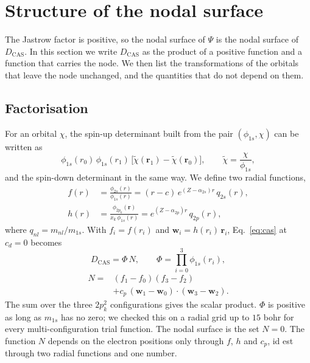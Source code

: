 \documentclass[aps,prb,reprint,amsmath,amssymb,superscriptaddress,nofootinbib]{revtex4-2}
\begin{document}
\section{Structure of the nodal surface}
\label{sec:nodes}

The Jastrow factor is positive, so the nodal surface of $\Psi$ is the nodal
surface of $D_{\mathrm{CAS}}$. In this section we write $D_{\mathrm{CAS}}$ as
the product of a positive function and a function that carries the node. We
then list the transformations of the orbitals that leave the node unchanged,
and the quantities that do not depend on them.

\subsection{Factorisation}
\label{ssec:factorisation}

For an orbital $\chi$, the spin-up determinant built from the pair
$(\phi_{1s}, \chi)$ can be written as
\begin{equation}
    \phi_{1s}(r_0)\,\phi_{1s}(r_1)\,
    \bigl[\tilde\chi(\mathbf{r}_1) - \tilde\chi(\mathbf{r}_0)\bigr] ,
    \qquad
    \tilde\chi = \frac{\chi}{\phi_{1s}} ,
    \label{eq:det_ratio}
\end{equation}
and the spin-down determinant in the same way. We define two radial functions,
\begin{align}
    f(r) &= \frac{\phi_{2s}(r)}{\phi_{1s}(r)}
          = (r - c)\, e^{(Z - \alpha_{2s}) r}\, q_{2s}(r) ,
    \label{eq:f} \\
    h(r) &= \frac{\phi_{2p_k}(\mathbf{r})}{x_k\, \phi_{1s}(r)}
          = e^{(Z - \alpha_{2p}) r}\, q_{2p}(r) ,
    \label{eq:h}
\end{align}
where $q_{nl} = m_{nl}/m_{1s}$. With $f_i = f(r_i)$ and
$\mathbf{w}_i = h(r_i)\,\mathbf{r}_i$, Eq.~\eqref{eq:cas} at $c_d = 0$ becomes
\begin{equation}
    D_{\mathrm{CAS}} = \Phi\, N ,
    \qquad
    \Phi = \prod_{i=0}^{3} \phi_{1s}(r_i) ,
    \label{eq:factorisation}
\end{equation}
\begin{equation}
\begin{aligned}
    N = {} & (f_1 - f_0)(f_3 - f_2) \\
      & + c_p\, (\mathbf{w}_1 - \mathbf{w}_0) \cdot (\mathbf{w}_3 - \mathbf{w}_2) .
\end{aligned}
    \label{eq:N}
\end{equation}
The sum over the three $2p_k^2$ configurations gives the scalar product.
$\Phi$ is positive as long as $m_{1s}$ has no zero; we checked this on a
radial grid up to $15$ bohr for every multi-configuration trial function. The
nodal surface is the set $N = 0$. The function $N$ depends on the electron
positions only through $f$, $h$ and $c_p$, id est through two radial
functions and one number.
\end{document}
